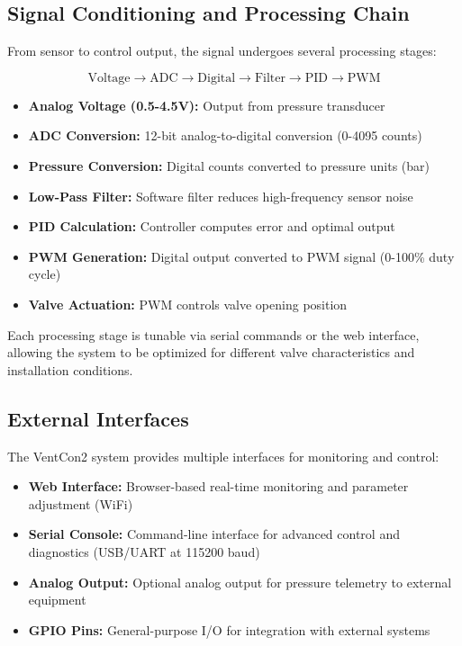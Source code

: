 \subsection{Signal Conditioning and Processing Chain}

From sensor to control output, the signal undergoes several processing stages:

    \begin{equation}
    \text{Voltage} \rightarrow \text{ADC} \rightarrow \text{Digital} \rightarrow \text{Filter} \rightarrow \text{PID} \rightarrow \text{PWM}
    \end{equation}

    \begin{itemize}
        \item \textbf{Analog Voltage (0.5-4.5V):} Output from pressure transducer
        \item \textbf{ADC Conversion:} 12-bit analog-to-digital conversion (0-4095 counts)
        \item \textbf{Pressure Conversion:} Digital counts converted to pressure units (bar)
        \item \textbf{Low-Pass Filter:} Software filter reduces high-frequency sensor noise
        \item \textbf{PID Calculation:} Controller computes error and optimal output
        \item \textbf{PWM Generation:} Digital output converted to PWM signal (0-100\% duty cycle)
        \item \textbf{Valve Actuation:} PWM controls valve opening position
    \end{itemize}

Each processing stage is tunable via serial commands or the web interface, allowing the system to be optimized for different valve characteristics and installation conditions.

\subsection{External Interfaces}

The VentCon2 system provides multiple interfaces for monitoring and control:

    \begin{itemize}
        \item \textbf{Web Interface:} Browser-based real-time monitoring and parameter adjustment (WiFi)
        \item \textbf{Serial Console:} Command-line interface for advanced control and diagnostics (USB/UART at 115200 baud)
        \item \textbf{Analog Output:} Optional analog output for pressure telemetry to external equipment
        \item \textbf{GPIO Pins:} General-purpose I/O for integration with external systems
    \end{itemize}
